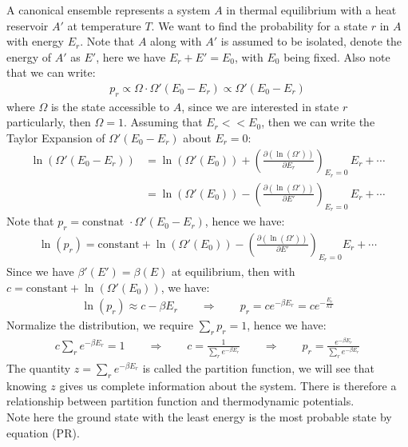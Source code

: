 \documentclass[11pt,oneside]{book}
\theoremstyle{break}
\theoremstyle{break}
\newcommand{\lr}[1]{\left( #1 \right)}
\begin{document}
\hfill\break
A canonical ensemble represents a system $A$ in thermal equilibrium with a heat reservoir $A'$ at temperature $T$. We want to find the probability for a state $r$ in $A$ with energy $E_r$. Note that $A$ along with $A'$ is assumed to be isolated, denote the energy of $A'$ as $E'$, here we have $E_r + E' = E_0$, with $E_0$ being fixed. Also note that we can write:
\begin{align*}
p_r \propto \Omega \cdot \Omega'(E_0 - E_r) \propto \Omega'(E_0 - E_r)
\end{align*}
where $\Omega$ is the state accessible to $A$, since we are interested in state $r$ particularly, then $\Omega = 1$. 
Assuming that $E_r<< E_0$, then we can write the Taylor Expansion of $\Omega'(E_0-E_r)$ about $E_r = 0$:
\begin{align*}
\ln\left(\Omega'(E_0 - E_r)\right)  &= \ln(\Omega'(E_0))+ \lr{\frac{\partial (\ln(\Omega'))}{\partial E_r}}_{E_r = 0}\, E_r + \cdots  \\
&= \ln(\Omega'(E_0))- \lr{\frac{\partial (\ln(\Omega'))}{\partial E'}}_{E_r = 0}\, E_r + \cdots 
\end{align*}
Note that $p_r = \text{constnat } \cdot \Omega'(E_0 - E_r)$, hence we have:
\begin{align*}
 \ln (p_r) = \text{constant} + \ln(\Omega'(E_0) )- \lr{\frac{\partial (\ln(\Omega'))}{\partial E'}}_{E_r = 0} E_r + \cdots 
\end{align*}
Since we have $\beta ' (E') = \beta(E)$ at equilibrium, then with $c = \text{constant}+\ln(\Omega'(E_0))$, we have:
\begin{align*}
\ln(p_r) \approx c - \beta E_r\qquad\Rightarrow \qquad p_r = ce^{-\beta E_r} = ce^{-\frac{E_r}{kT}}
\end{align*}
Normalize the distribution, we require $\sum_r p_r = 1$, hence we have:
\begin{align*}
 c \sum_r e^{-\beta E_r} = 1 \qquad \Rightarrow \qquad c = \frac{1}{\sum_r e^{-\beta E_r}} \qquad \Rightarrow \qquad p_r = \frac{e^{-\beta E_r}}{\sum_r e^{-\beta E_r}}\tag{PR}
\end{align*}
The quantity $z = \sum_r e^{-\beta E_r}$ is called the partition function, we will see that knowing $z$ gives us complete information about the system. There is therefore a relationship between partition function and thermodynamic potentials. \\

Note here the ground state with the least energy is the most probable state by equation (PR). \\
\end{document}
